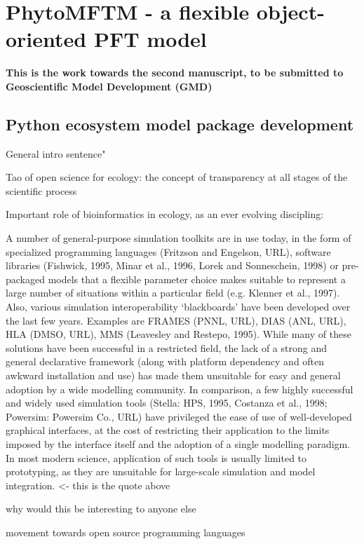 \chapter{PhytoMFTM - a flexible object-oriented PFT model}


\small {\textbf{This is the work towards the second manuscript, to be submitted to Geoscientific Model Development (GMD)}}


\normalsize
\section{Python ecosystem model package development}
General intro sentence" 

Tao of open science for ecology: \citep{Hampton2015}
the concept of transparency at all stages of the scientific process

Important role of bioinformatics in ecology, as an ever evolving discipling: \citep{Michener2012}

A number of general-purpose simulation toolkits are in use today, in the form of specialized programming languages (Fritzson and Engelson, URL), software libraries (Fishwick, 1995, Minar et al., 1996, Lorek and Sonneschein, 1998) or pre-packaged models that a flexible parameter choice makes suitable to represent a large number of situations within a particular field (e.g. Klenner et al., 1997). Also, various simulation interoperability ‘blackboards’ have been developed over the last few years. Examples are FRAMES (PNNL, URL), DIAS (ANL, URL), HLA (DMSO, URL), MMS (Leavesley and Restepo, 1995). While many of these solutions have been successful in a restricted field, the lack of a strong and general declarative framework (along with platform dependency and often awkward installation and use) has made them unsuitable for easy and general adoption by a wide modelling community. In comparison, a few highly successful and widely used simulation tools (Stella: HPS, 1995, Costanza et al., 1998; Powersim: Powersim Co., URL) have privileged the ease of use of well-developed graphical interfaces, at the cost of restricting their application to the limits imposed by the interface itself and the adoption of a single modelling paradigm. In most modern science, application of such tools is usually limited to prototyping, as they are unsuitable for large-scale simulation and model integration.
\citep{Villa2001} <- this is the quote above
 
why would this be interesting to anyone else


movement towards open source programming languages

